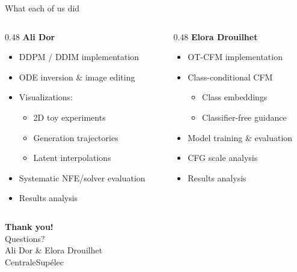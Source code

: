 \documentclass[aspectratio=169,10pt]{beamer}
\begin{document}
\begin{frame}{What each of us did}
\begin{columns}[T]
\begin{column}{0.48\textwidth}
\textbf{\textcolor{cfmblue}{Ali Dor}}
\begin{itemize}
    \item DDPM / DDIM implementation
    \item ODE inversion \& image editing
    \item Visualizations:
    \begin{itemize}
        \item 2D toy experiments
        \item Generation trajectories
        \item Latent interpolations
    \end{itemize}
    \item Systematic NFE/solver evaluation
    \item Results analysis
\end{itemize}
\end{column}
\begin{column}{0.48\textwidth}
\textbf{\textcolor{accentgreen}{Elora Drouilhet}}
\begin{itemize}
    \item OT-CFM implementation
    \item Class-conditional CFM
    \begin{itemize}
        \item Class embeddings
        \item Classifier-free guidance
    \end{itemize}
    \item Model training \& evaluation
    \item CFG scale analysis
    \item Results analysis
\end{itemize}
\end{column}
\end{columns}
\end{frame}

\begin{frame}[plain]
\centering
\vfill
{\Huge\bfseries Thank you!}\\[1.5em]
{\large Questions?}\\[2em]
{\small Ali Dor \& Elora Drouilhet}\\
{\small CentraleSup\'elec}
\vfill
\end{frame}
\end{document}
